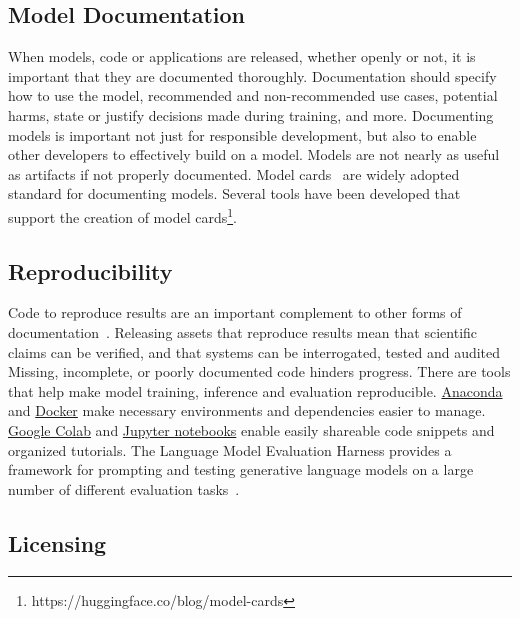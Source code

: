 
\subsection{Model Documentation}

When models, code or applications are released, whether openly or not, it is important that they are documented thoroughly. Documentation should specify how to use the model, recommended and non-recommended use cases, potential harms, state or justify decisions made during training, and more. Documenting models is important not just for responsible development, but also to enable other developers to effectively build on a model. Models are not nearly as useful as artifacts if not properly documented. Model cards~\citep{mitchell2019model} are widely adopted standard for documenting models. Several tools have been developed that support the creation of model cards\footnote{https://huggingface.co/blog/model-cards}. 

\subsection{Reproducibility}

Code to reproduce results are an important complement to other forms of documentation~\cite{Kapoor2023REFORMSRS}. Releasing assets that reproduce results mean that scientific claims can be verified, and that systems can be interrogated, tested and audited  Missing, incomplete, or poorly documented code hinders progress.  There are tools that help make model training, inference and evaluation reproducible. \href{https://www.anaconda.com/}{Anaconda} and \href{https://www.docker.com/}{Docker} make necessary environments and dependencies easier to manage. \href{https://colab.research.google.com/}{Google Colab} and \href{https://jupyter.org/}{Jupyter notebooks} enable easily shareable code snippets and organized tutorials. The Language Model Evaluation Harness provides a framework for prompting and testing generative language models on a large number of different evaluation tasks~\citep{eval-harness}.

\subsection{Licensing}


